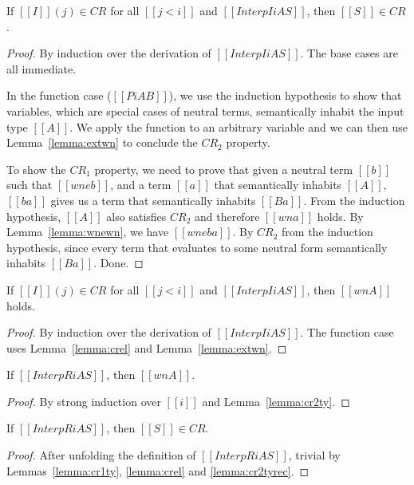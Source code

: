 \documentclass[acmsmall,screen=true,
\ifpublic review=false\else,review=true\fi
  ,anonymous=\ifanonymous true\else false\fi]{acmart}
\begin{document}
\begin{lemma}
  \label{lemma:crel}
  If $[[I]](j) \in CR$ for all $[[j < i]]$ and $[[Interp I i A S]]$, then $[[S]] \in CR$.
\end{lemma}
\begin{proof}
  By induction over the derivation of $[[Interp I i A S]]$. The base
  cases are all immediate.

  In the function case ($[[Pi A B]]$), we use the induction
  hypothesis to show that variables, which are special cases of
  neutral terms, semantically inhabit the input type $[[A]]$. We apply the
  function to an arbitrary variable and we can then use
  Lemma~\ref{lemma:extwn} to conclude the $CR_2$ property.

  To show
  the $CR_1$ property, we need to prove that given a neutral term $[[b]]$
  such that $[[wne b]]$,
  and a term $[[a]]$ that semantically inhabits $[[A]]$, $[[b a]]$ gives
  us a term that semantically inhabits $[[B {a}]]$. From the induction
  hypothesis, $[[A]]$ also satisfies $CR_2$ and therefore $[[wn a]]$
  holds. By Lemma~\ref{lemma:wnewn}, we have $[[wne b a]]$. By $CR_2$
  from the induction hypothesis, since every term that evaluates to
  some neutral form semantically inhabits $[[B {a}]]$. Done.
\end{proof}


\begin{lemma}
  \label{lemma:cr2ty}
  If $[[I]](j) \in CR$ for all $[[j < i]]$ and $[[Interp I i A S]]$, then $[[wn A]]$ holds.
\end{lemma}
\begin{proof}
  By induction over the derivation of $[[Interp I i A S]]$. The
  function case uses Lemma~\ref{lemma:crel} and Lemma~\ref{lemma:extwn}.
\end{proof}

\begin{lemma}
  \label{lemma:cr2tyrec}
  If $[[InterpR i A S]]$, then $[[wn A]]$.
\end{lemma}
\begin{proof}
  By strong induction over $[[i]]$ and Lemma~\ref{lemma:cr2ty}.
\end{proof}

\begin{lemma}
  \label{lemma:crelrec}
  If $[[InterpR i A S]]$, then $[[S]] \in CR$.
\end{lemma}
\begin{proof}
  After unfolding the definition of $[[InterpR i A S]]$, trivial by
  Lemmas~\ref{lemma:cr1ty}, \ref{lemma:crel} and \ref{lemma:cr2tyrec}.
\end{proof}
\end{document}
